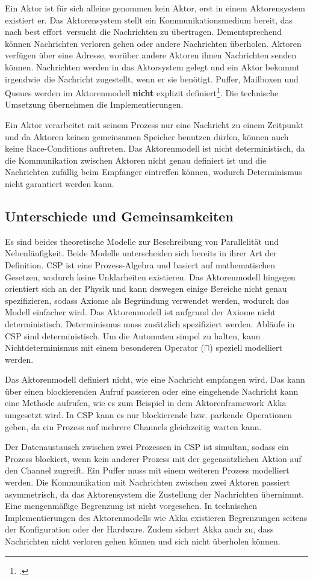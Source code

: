 Ein Aktor ist für sich alleine genommen kein Aktor, erst in einem Aktorensystem existiert er. Das Aktorensystem stellt ein Kommunikationsmedium bereit, das nach \glqq best effort\grqq\ versucht die Nachrichten zu übertragen. Dementsprechend können Nachrichten verloren gehen oder andere Nachrichten überholen. Aktoren verfügen über eine Adresse, worüber andere Aktoren ihnen Nachrichten senden können. Nachrichten werden in das Aktorsystem gelegt und ein Aktor bekommt \glqq irgendwie\grqq\ die Nachricht zugestellt, wenn er sie benötigt. Puffer, Mailboxen und Queues werden im Aktorenmodell \textbf{nicht} explizit definiert\footcite[Seite 3, Rechte Spalte]{ACTORSNEW}. Die technische Umsetzung übernehmen die Implementierungen.

Ein Aktor verarbeitet mit seinem Prozess nur eine Nachricht zu einem Zeitpunkt und da Aktoren keinen gemeinsamen Speicher benutzen dürfen, können auch keine Race-Conditions auftreten.
Das Aktorenmodell ist nicht deterministisch, da die Kommunikation zwischen Aktoren nicht genau definiert ist und die Nachrichten zufällig beim Empfänger eintreffen können, wodurch Determinismus nicht garantiert werden kann.

\subsection{Unterschiede und Gemeinsamkeiten}
Es sind beides theoretische Modelle zur Beschreibung von Parallelität und Nebenläufigkeit. 
Beide Modelle unterscheiden sich bereits in ihrer Art der Definition. \ac{CSP} ist eine Prozess-Algebra und basiert auf mathematischen Gesetzen, wodurch keine Unklarheiten existieren. Das Aktorenmodell hingegen orientiert sich an der Physik und kann deswegen einige Bereiche nicht genau spezifizieren, sodass Axiome als Begründung verwendet werden, wodurch das Modell einfacher wird. Das Aktorenmodell ist aufgrund der Axiome nicht deterministisch. Determinismus muss zusätzlich spezifiziert werden. Abläufe in \ac{CSP} sind deterministisch. Um die Automaten simpel zu halten, kann Nichtdeterminismus mit einem besonderen Operator ($\sqcap$) speziell modelliert werden.

Das Aktorenmodell definiert nicht, wie eine Nachricht empfangen wird. Das kann über einen blockierenden Aufruf passieren oder eine eingehende Nachricht kann eine Methode aufrufen, wie es zum Beispiel in dem Aktorenframework Akka umgesetzt wird. In \ac{CSP} kann es nur blockierende bzw. parkende Operationen geben, da ein Prozess auf mehrere Channels gleichzeitig warten kann.

Der Datenaustausch zwischen zwei Prozessen in \ac{CSP} ist simultan, sodass ein Prozess blockiert, wenn kein anderer Prozess mit der gegensätzlichen Aktion auf den Channel zugreift. Ein Puffer muss mit einem weiteren Prozess modelliert werden. Die Kommunikation mit Nachrichten zwischen zwei Aktoren passiert asymmetrisch, da das Aktorensystem die Zustellung der Nachrichten übernimmt. Eine mengenmäßige Begrenzung ist nicht vorgesehen. In technischen Implementierungen des Aktorenmodells wie Akka existieren Begrenzungen seitens der Konfiguration oder der Hardware. Zudem sichert Akka auch zu, dass Nachrichten nicht verloren gehen können und sich nicht überholen können.
